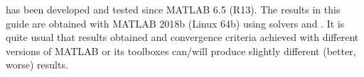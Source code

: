  has been developed and tested since MATLAB 6.5 (R13). The
results in this guide are obtained with MATLAB 2018b (Linux 64b) using
solvers  and . It is quite usual that results
obtained and convergence criteria achieved with different versions of
MATLAB or its toolboxes can/will produce slightly different (better,
worse) results.


